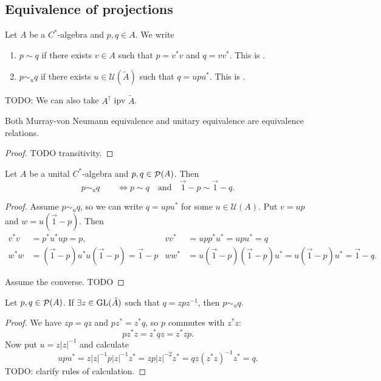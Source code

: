 \subsection{Equivalence of projections}
\begin{definition}
Let $A$ be a $C^*$-algebra and $p,q\in A$. We write
\begin{enumerate}
\item $p\sim q$ if there exists $v\in A$ such that $p = v^*v$ and $q=vv^*$. This is .
\item $p \sim_u q$ if there exists $u\in \mathcal{U}(\tilde{A})$ such that $q = upu^*$. This is .
\end{enumerate}
\end{definition}
TODO: We can also take $A^\dagger$ ipv $\tilde{A}$.

\begin{lemma}
Both Murray-von Neumann equivalence and unitary equivalence are equivalence relations.
\end{lemma}
\begin{proof}
TODO transitivity.
\end{proof}

\begin{lemma}
Let $A$ be a unital $C^*$-algebra and $p,q\in\mathop{\mathcal{P}}\nolimits(A)$. Then
\[ p \sim_u q \qquad \iff p \sim q \quad \text{and}\quad \vec{1} - p \sim \vec{1} - q. \]
\end{lemma}
\begin{proof}
Assume $p \sim_u q$, so we can write $q = upu^*$ for some $u\in\mathcal{U}(A)$. Put $v = up$ and $w = u(\vec{1}-p)$. Then
\begin{align*}
v^*v &= p^*u^*up = p, & vv^* &= upp^*u^* = upu^* = q \\
w^*w &= (\vec{1}-p)u^*u(\vec{1}-p) = \vec{1} - p & ww^* &= u(\vec{1}-p)(\vec{1}-p)u^* = u(\vec{1}-p)u^* = \vec{1} - q.
\end{align*}

Assume the converse. TODO
\end{proof}

\begin{lemma}
Let $p,q\in \mathop{\mathcal{P}}\nolimits(A)$. If $\exists z\in \operatorname{GL}(\tilde{A})$ such that $q = zpz^{-1}$, then $p\sim_u q$.
\end{lemma}
\begin{proof}
We have $zp = qz$ and $pz^* = z^*q$, so $p$ commutes with $z^*z$:
\[ pz^*z = z^*qz = z^*zp. \]
Now put $u = z|z|^{-1}$ and calculate
\[ upu^* = z|z|^{-1}p|z|^{-1}z^* = zp|z|^{-2}z^* = qz(z^*z)^{-1}z^* = q. \]
TODO: clarify rules of calculation.
\end{proof}

